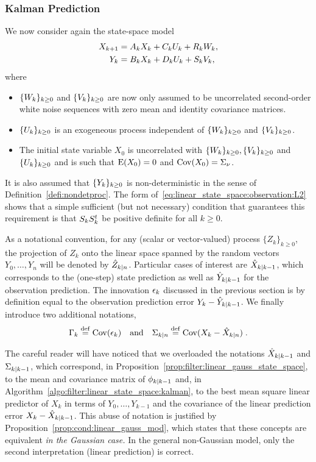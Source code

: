 \subsubsection{Kalman Prediction}
We now consider again the state-space model
\begin{align}
X_{k+1} & = A_{k} X_k + C_k U_k + R_{k}W_{k}, \label{eq:linear_state_space:state:L2}\\
Y_k & = B_{k} X_k + D_k U_k + S_k V_k, \label{eq:linear_state_space:observation:L2}
\end{align}
where 
\begin{itemize}
\item $\{W_k\}_{k\geq 0}$ and $\{V_k\}_{k\geq 0}$ are now only assumed to be uncorrelated
second-order white noise sequences with zero mean and identity covariance
matrices. 
\item $\{U_k\}_{k\geq 0}$ is an exogeneous process independent of $\{W_k\}_{k\geq 0}$ and $\{V_k\}_{k\geq 0}$.
\item The initial state variable $X_0$ is  uncorrelated with
$\{W_k\}_{k\geq 0}, \{V_k\}_{k\geq 0}$ and $\{U_k\}_{k\geq 0}$  and is such that $\operatorname{E}(X_0) = 0$ and $\operatorname{Cov}(X_0) =
\Sigma_{\nu}$. 
\end{itemize}
It is also assumed that $\{Y_k\}_{k\geq 0}$ is non-deterministic in the
sense of Definition~\ref{defi:nondetproc}. The form
of~\eqref{eq:linear_state_space:observation:L2} shows that a simple sufficient
(but not necessary) condition that guarantees this requirement is that
$\VCov[k]$ be positive definite for all $k \geq 0$.

As a notational convention, for any (scalar or vector-valued) process $\{ Z_k
\}_{k\geq 0}$, the projection of $Z_k$ onto the linear space spanned by the
random vectors $Y_0, \ldots, Y_n$ will be denoted by $\hat{Z}_{k|n}$.
Particular cases of interest are $\hat{X}_{k|k-1}$, which corresponds to the
(one-step) state prediction as well as $\hat{Y}_{k|k-1}$ for the observation
prediction. The innovation $\epsilon_k$ discussed in the previous section is by
definition equal to the observation prediction error $Y_k - \hat{Y}_{k|k-1}$.
We finally introduce two additional notations,
\[
  \Gamma_k \stackrel{\mathrm{def}}{=} \operatorname{Cov}(\epsilon_k)  \quad \text{and} \quad \Sigma_{k|n} \stackrel{\mathrm{def}}{=} \operatorname{Cov}(X_k - \hat{X}_{k|n}) \; .
\]

\begin{rem}
  The careful reader will have noticed that we overloaded the notations
  $\hat{X}_{k|k-1}$ and $\Sigma_{k|k-1}$, which correspond, in
  Proposition~\ref{prop:filter:linear_gauss_state_space}, to the mean and
  covariance matrix of $\pred{k}{k-1}$ and, in
  Algorithm~\ref{algo:filter:linear_state_space:kalman}, to the best mean square
  linear predictor of $X_k$ in terms of $Y_0,\dots,Y_{k-1}$ and the
  covariance of the linear prediction error $X_k-\hat{X}_{k|k-1}$.
  This abuse of notation is justified by
  Proposition~\ref{prop:cond:linear_gauss_mod}, which states that these
  concepts are equivalent {\em in the Gaussian case.} In the general non-Gaussian
  model, only the second interpretation (linear prediction) is correct.
\end{rem}


